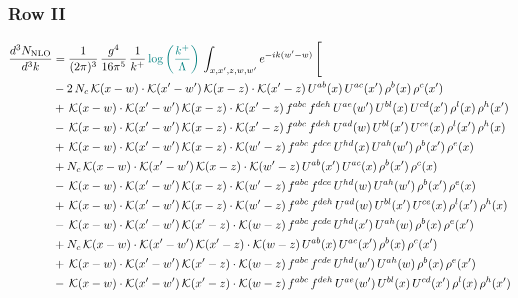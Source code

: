 \documentclass[9pt]{article}
\numberwithin{equation}{section}
\begin{document}
\subsubsection{Row II}
\begin{align}
\frac{d^{3}N_{\mathrm{NLO}}}{d^{3}k} & = \frac{1}{(2\pi)^{3}}\,\frac{g^{4}}{16\pi^{5}}\,\frac{1}{k^{+}}\,{\color{teal}\log{\left(\frac{k^{+}}{\Lambda}\right)}}\,\int_{x,x',z,w,w'}e^{-ik(w'-w)}\,\Bigg[\notag\\ &  -2\,N_{c}\,\mathcal{K}(x-w)\cdot\mathcal{K}(x'-w')\,\mathcal{K}(x-z)\cdot\mathcal{K}(x'-z)\,U^{ab}(x)\,U^{ac}(x')\,\rho^{b}(x)\,\rho^{c}(x')\notag\\
& +\,\mathcal{K}(x-w)\cdot\mathcal{K}(x'-w')\,\mathcal{K}(x-z)\cdot\mathcal{K}(x'-z)\,f^{abc}\,f^{deh}\,U^{ae}(w')\,U^{bl}(x)\,U^{cd}(x')\,\rho^{l}(x)\,\rho^{h}(x')\notag\\
& -\,\mathcal{K}(x-w)\cdot\mathcal{K}(x'-w')\,\mathcal{K}(x-z)\cdot\mathcal{K}(x'-z)\,f^{abc}\,f^{deh}\,U^{ad}(w)\,U^{bl}(x')\,U^{ce}(x)\,\rho^{l}(x')\,\rho^{h}(x)\notag\\
& +\,\mathcal{K}(x-w)\cdot\mathcal{K}(x'-w')\,\mathcal{K}(x-z)\cdot\mathcal{K}(w'-z)\,f^{abc}\,f^{dce}\,U^{hd}(x)\,U^{ah}(w')\,\rho^{b}(x')\,\rho^{e}(x)\notag\\
& +N_{c}\,\mathcal{K}(x-w)\cdot\mathcal{K}(x'-w')\,\mathcal{K}(x-z)\cdot\mathcal{K}(w'-z)\,U^{ab}(x')\,U^{ac}(x)\,\rho^{b}(x')\,\rho^{c}(x)\notag\\
& -\,\mathcal{K}(x-w)\cdot\mathcal{K}(x'-w')\,\mathcal{K}(x-z)\cdot\mathcal{K}(w'-z)\,f^{abc}\,f^{dce}\,U^{hd}(w)\,U^{ah}(w')\,\rho^{b}(x')\,\rho^{e}(x)\notag\\
& +\,\mathcal{K}(x-w)\cdot\mathcal{K}(x'-w')\,\mathcal{K}(x-z)\cdot\mathcal{K}(w'-z)\,f^{abc}\,f^{deh}\,U^{ad}(w)\,U^{bl}(x')\,U^{ce}(x)\,\rho^{l}(x')\,\rho^{h}(x)\notag\\
& -\,\mathcal{K}(x-w)\cdot\mathcal{K}(x'-w')\,\mathcal{K}(x'-z)\cdot\mathcal{K}(w-z)\,f^{abc}\,f^{cde}\,U^{hd}(x')\,U^{ah}(w)\,\rho^{b}(x)\,\rho^{e}(x')\notag\\
& +N_{c}\,\mathcal{K}(x-w)\cdot\mathcal{K}(x'-w')\,\mathcal{K}(x'-z)\cdot\mathcal{K}(w-z)\,U^{ab}(x)\,U^{ac}(x')\,\rho^{b}(x)\,\rho^{c}(x')\notag\\
& +\,\mathcal{K}(x-w)\cdot\mathcal{K}(x'-w')\,\mathcal{K}(x'-z)\cdot\mathcal{K}(w-z)\,f^{abc}\,f^{cde}\,U^{hd}(w')\,U^{ah}(w)\,\rho^{b}(x)\,\rho^{e}(x')\notag\\
& -\,\mathcal{K}(x-w)\cdot\mathcal{K}(x'-w')\,\mathcal{K}(x'-z)\cdot\mathcal{K}(w-z)\,f^{abc}\,f^{deh}\,U^{ae}(w')\,U^{bl}(x)\,U^{cd}(x')\,\rho^{l}(x)\,\rho^{h}(x')\notag\\

\end{align}
\end{document}
